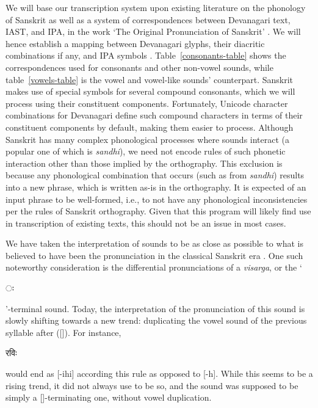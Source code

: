 \documentclass[10pt,a4paper]{article}
\let\ipa\textipa
\newcommand{\sansk}[1]{\begin{sanskrit}#1\end{sanskrit}}
\begin{document}


We will base our transcription system upon existing literature on the phonology of Sanskrit \cite{jamison2004sanskrit} as well as a system of correspondences between Devanagari text, IAST, and IPA, in the work `The Original Pronunciation of Sanskrit' \cite{zieba2002original}. We will hence establish a mapping between Devanagari glyphs, their diacritic combinations if any, and IPA symbols \cite{international1999handbook}. Table~\ref{consonants-table} shows the correspondences used for consonants and other non-vowel sounds, while table~\ref{vowels-table} is the vowel and vowel-like sounds' counterpart.
Sanskrit makes use of special symbols for several compound consonants, which we will process using their constituent components. Fortunately, Unicode character combinations for Devanagari define such compound characters in terms of their constituent components by default, making them easier to process.
Although Sanskrit has many complex phonological processes where sounds interact (a popular one of which is \textit{sandhi}), we need not encode rules of such phonetic interaction other than those implied by the orthography. This exclusion is because any phonological combination that occurs (such as from \textit{sandhi}) results into a new phrase, which is written as-is in the orthography. It is expected of an input phrase to be well-formed, i.e., to not have any phonological inconsistencies per the rules of Sanskrit orthography. Given that this program will likely find use in transcription of existing texts, this should not be an issue in most cases.

We have taken the interpretation of sounds to be as close as possible to what is believed to have been the pronunciation in the classical Sanskrit era \cite{zieba2002original,jamison2004sanskrit}. One such noteworthy consideration is the differential pronunciations of a {\it visarga}, or the `\sansk{ः}'-terminal sound. Today, the interpretation of the pronunciation of this sound is slowly shifting towards a new trend: duplicating the vowel sound of the previous syllable after ([{\it \ipa{h}}]). For instance, \sansk{रविः} would end as [-ihi] according this rule as opposed to [-h]. While this seems to be a rising trend, it did not always use to be so,  and the sound was supposed to be simply a {[\ipa{h}]}-terminating one, without vowel duplication.
\end{document}
